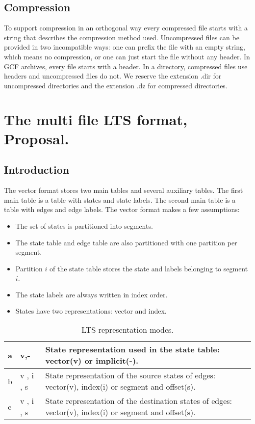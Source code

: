 \subsection{Compression}

To support compression in an orthogonal way every compressed file starts with a string that describes
the compression method used. Uncompressed files can be provided in two incompatible ways: one can prefix the file with an empty string, which means 
no compression, or one can just start the file without any header.
In GCF archives, every file starts with a header. In a directory, compressed files use headers and uncompressed files do not.
We reserve the extension .dir for uncompressed directories and the extension .dz for compressed directories.

\section{The multi file LTS format, Proposal.}

\subsection{Introduction}

The vector format stores two main tables and several auxiliary tables. The first main table is a table with states and state labels.
The second main table is a table with edges and edge labels. The vector format makes a few assumptions:
\begin{itemize}
\item The set of states is partitioned into segments.
\item The state table and edge table are also partitioned with one partition per segment.
\item Partition $i$ of the state table stores the state and labels belonging to segment $i$.
\item The state labels are always written in index order.
\item States have two representations: vector and index.
\end{itemize}


\begin{table}[tp]
\caption{LTS representation modes.}
\label{mode table}
\begin{tabularx}{\textwidth}{|l|l|X|}
\hline
a & v,- & State representation used in the state table: vector(v) or implicit(-).
\\\hline
b & v , i , s & State representation of the source states of edges: vector(v), index(i) or segment and offset(s).
\\\hline
c & v , i , s & State representation of the destination states of edges: vector(v), index(i) or segment and offset(s).
\\\hline
\end{tabularx}
\end{table}

